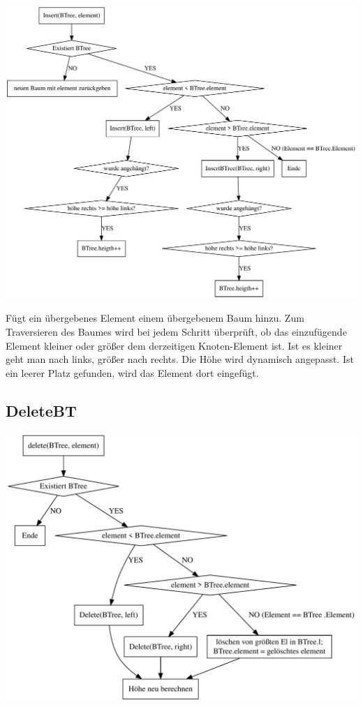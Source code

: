 \documentclass[11pt]{article}
\begin{document}
    \begin{center}
        \includegraphics[width=1\columnwidth] {insert}
    \end{center}



    Fügt ein übergebenes Element einem übergebenem Baum hinzu. Zum Traversieren des Baumes wird bei jedem Schritt überprüft, ob das einzufügende Element kleiner oder größer dem derzeitigen Knoten-Element ist. Ist es kleiner geht man nach links, größer nach rechts. Die Höhe wird dynamisch angepasst. Ist ein leerer Platz gefunden, wird das Element dort eingefügt.

    \subsection{DeleteBT}

    \begin{center}
        \includegraphics[width=0.8\columnwidth] {delete}
    \end{center}
\end{document}
